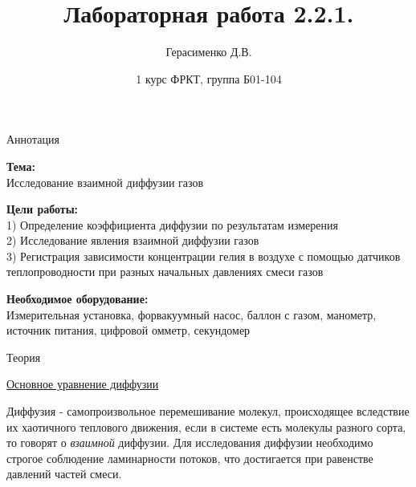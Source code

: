 \documentclass{article}
\title{
    \textbf{Лабораторная работа 2.2.1.}
}
\author{Герасименко Д.В.}
\date{1 курс ФРКТ, группа Б01-104}
\begin{document}
\maketitle

\begin{center}
    \raggedleft
    {
        \LARGE {Аннотация}
    }
    \hline
    \hline
\end{center}

\begin{center}
    \raggedright
    {
        \Large{\textbf{Тема:}}
        \\
    }
    \large {Исследование взаимной диффузии газов}
\end{center}

\begin{center}
    \raggedright
    {
        \large{\textbf{Цели работы:}}
        \\
    }
    \large {1) Определение коэффициента диффузии по результатам измерения}
    \\
    \large {2) Исследование явления взаимной диффузии газов}
    \\
    \large {3) Регистрация зависимости концентрации гелия в воздухе с помощью датчиков теплопроводности при разных начальных давлениях смеси газов}
    \\
\end{center}

\begin{center}
    \raggedright
    {
        \large{\textbf{Необходимое оборудование:}}
        \\
    }
    \large {Измерительная установка, форвакуумный насос, баллон с газом, манометр, источник питания, цифровой омметр, секундомер}
\end{center}

\begin{center}
    \raggedleft
    {
        \LARGE {Теория}
    }
    \hline
    \hline
\end{center}

\begin{center}
    \raggedright
    {
        \large{\underline{Основное уравнение диффузии}}
    }
\end{center}

Диффузия - самопроизвольное перемешивание молекул, происходящее вследствие их хаотичного теплового движения, если в системе есть молекулы разного сорта, то говорят о \textit{взаимной} диффузии. Для исследования диффузии необходимо строгое соблюдение ламинарности потоков, что достигается при равенстве давлений частей смеси.
\end{document}
